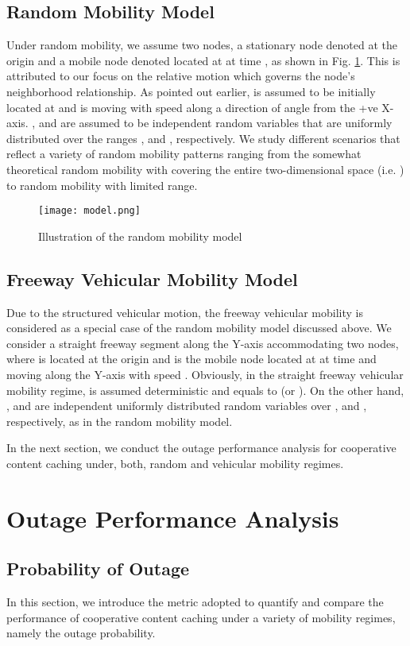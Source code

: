 \documentclass[conference,a4paper]{IEEEtran}
\begin{document}
\subsection{Random Mobility Model}
Under random mobility, we assume two nodes, a stationary node denoted  at the origin and a mobile node denoted  located at  at time , as shown in Fig. \ref{Flo:model}. This is attributed to our focus on the relative motion which governs the node's neighborhood relationship. As pointed out earlier,  is assumed to be initially located at  and is moving with speed  along a direction of angle  from the +ve X-axis. ,  and  are assumed to be independent random variables that are uniformly distributed over the ranges ,  and , respectively.  We study different scenarios that reflect a variety of random mobility patterns ranging from the somewhat theoretical random mobility with  covering the entire two-dimensional space (i.e. ) to random mobility with limited  range.
\begin{figure}[!t]
\centering
\texttt{[image: model.png]}
\setlength{\abovecaptionskip}{0pt}
\setlength{\belowcaptionskip}{-10pt}
\caption{Illustration of the random mobility model}
\label{Flo:model}
\end{figure}


\subsection{Freeway Vehicular Mobility Model}
Due to the structured vehicular motion, the freeway vehicular mobility is considered as a special case of the random mobility model discussed above. We consider a straight freeway segment along the Y-axis accommodating two nodes, where  is located  at the origin and  is the mobile node located at  at time  and moving along the Y-axis with speed . Obviously,  in the straight freeway vehicular mobility regime, is assumed deterministic and equals to  (or ). On the other hand, , and  are independent uniformly distributed random variables over , and , respectively, as in the random mobility model.

In the next section, we conduct the outage performance analysis for cooperative content caching under, both, random and vehicular mobility regimes.

\section{Outage Performance Analysis \label{sec:outage}}
\subsection{Probability of Outage}
In this section, we introduce the metric adopted to quantify and compare the performance of cooperative content caching under a variety of mobility regimes, namely the outage probability.
\end{document}
